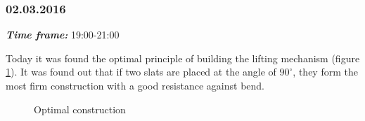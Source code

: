 \subsubsection{02.03.2016}
\textit{\textbf{Time frame:}} 19:00-21:00 

Today it was found the optimal principle of building the lifting mechanism (figure \ref{Elevator4.5}). It was found out that if two slats are placed at the angle of $90^\circ$, they form the most firm construction with a good resistance against bend.

\begin{figure}[H]
	\begin{minipage}[h]{1\linewidth}
		\caption{Optimal construction}
		\label{Elevator4.5}
	\end{minipage}
\end{figure}
